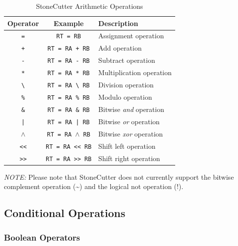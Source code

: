 \documentclass{article}
\begin{document}
\begin{table}[h]
\begin{center}
\caption{StoneCutter Arithmetic Operations}
\vspace{0.125in}
\label{tab:arithops}
\begin{tabular}{|c|c|l|}
\hline
\textbf{Operator} & \textbf{Example} & \textbf{Description}\\
\hline
\texttt{=} & \texttt{RT = RB} & Assignment operation\\
\hline
\texttt{+} & \texttt{RT = RA + RB} & Add operation\\
\hline
\texttt{-} & \texttt{RT = RA - RB} & Subtract operation\\
\hline
\texttt{*} & \texttt{RT = RA * RB} & Multiplication operation\\
\hline
\texttt{\textbackslash} & \texttt{RT = RA \textbackslash~RB} & Division operation\\
\hline
\texttt{\%} & \texttt{RT = RA \% RB} & Modulo operation\\
\hline
\texttt{\&} & \texttt{RT = RA \& RB} & Bitwise \textit{and} operation\\
\hline
\texttt{|} & \texttt{RT = RA | RB} & Bitwise \textit{or} operation\\
\hline
\texttt{$\wedge$} & \texttt{RT = RA $\wedge$ RB} & Bitwise \textit{xor} operation\\
\hline
\texttt{<<} & \texttt{RT = RA << RB} & Shift left operation\\
\hline
\texttt{>>} & \texttt{RT = RA >> RB} & Shift right operation\\
\hline
\end{tabular}
\end{center}
\end{table}

\textit{NOTE:} Please note that StoneCutter does not currently support the bitwise complement 
operation (\textasciitilde) and the logical not operation (!).  

\clearpage
\subsection{Conditional Operations}
\label{sec:ConditionalOperations}

\subsubsection{Boolean Operators}
\label{sec:BooleanOperators}
\end{document}
